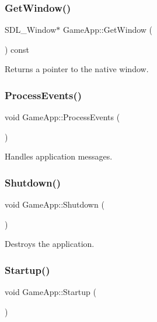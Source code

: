 \subsubsection{\texorpdfstring{Get\+Window()}{GetWindow()}}
{\footnotesize\ttfamily S\+D\+L\+\_\+\+Window$\ast$ Game\+App\+::\+Get\+Window (\begin{DoxyParamCaption}{ }\end{DoxyParamCaption}) const\hspace{0.3cm}{\ttfamily [inline]}}

Returns a pointer to the native window. \mbox{\label{class_game_app_a62c5268bda2f50c7535848cd21c884b4}} 
\subsubsection{\texorpdfstring{Process\+Events()}{ProcessEvents()}}
{\footnotesize\ttfamily void Game\+App\+::\+Process\+Events (\begin{DoxyParamCaption}{ }\end{DoxyParamCaption})}

Handles application messages. \mbox{\label{class_game_app_a0dc0f7396813debb806c16d79efcb111}} 
\subsubsection{\texorpdfstring{Shutdown()}{Shutdown()}}
{\footnotesize\ttfamily void Game\+App\+::\+Shutdown (\begin{DoxyParamCaption}{ }\end{DoxyParamCaption})\hspace{0.3cm}{\ttfamily [virtual]}}

Destroys the application. \mbox{\label{class_game_app_a9d9218c197e35c45cd0027f109dcd6a2}} 
\subsubsection{\texorpdfstring{Startup()}{Startup()}}
{\footnotesize\ttfamily void Game\+App\+::\+Startup (\begin{DoxyParamCaption}{ }\end{DoxyParamCaption})\hspace{0.3cm}{\ttfamily [virtual]}}

